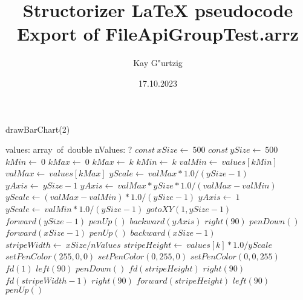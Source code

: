 \documentclass[a4paper,10pt]{article}
\title{Structorizer LaTeX pseudocode Export of FileApiGroupTest.arrz}
\author{Kay G"urtzig}
\date{17.10.2023}
\begin{document}
\begin{algorithm}
\caption{drawBarChart(2)}
\begin{algorithmic}[5]
\State {}
\State {}
\State {}
\State {}
    \State values: array\ of\ double
    \State nValues: ?
  \EndDecl
  \State \(const\ xSize\gets\ 500\)
  \State \(const\ ySize\gets\ 500\)
  \State \(kMin\gets\ 0\)
  \State \(kMax\gets\ 0\)
      \State \(kMax\gets\ k\)
    \Else
        \State \(kMin\gets\ k\)
      \EndIf
    \EndIf
  \EndFor
  \State \(valMin\gets\ values[kMin]\)
  \State \(valMax\gets\ values[kMax]\)
  \State \(yScale\gets\ valMax*1.0/(ySize-1)\)
  \State \(yAxis\gets\ ySize-1\)
      \State \(yAxis\gets\ valMax*ySize*1.0/(valMax-valMin)\)
      \State \(yScale\gets(valMax-valMin)*1.0/(ySize-1)\)
    \Else
      \State \(yAxis\gets\ 1\)
      \State \(yScale\gets\ valMin*1.0/(ySize-1)\)
    \EndIf
  \EndIf
  \State \(gotoXY(1,ySize-1)\)
  \State \(forward(ySize-1)\)
  \State \(penUp()\)
  \State \(backward(yAxis)\)
  \State \(right(90)\)
  \State \(penDown()\)
  \State \(forward(xSize-1)\)
  \State \(penUp()\)
  \State \(backward(xSize-1)\)
  \State \(stripeWidth\gets\ xSize/nValues\)
    \State \(stripeHeight\gets\ values[k]*1.0/yScale\)
        \State \(setPenColor(255,0,0)\)
      \EndSelector
        \State \(setPenColor(0,255,0)\)
      \EndSelector
        \State \(setPenColor(0,0,255)\)
      \EndSelector
    \EndCase
    \State \(fd(1)\)
    \State \(left(90)\)
    \State \(penDown()\)
    \State \(fd(stripeHeight)\)
    \State \(right(90)\)
    \State \(fd(stripeWidth-1)\)
    \State \(right(90)\)
    \State \(forward(stripeHeight)\)
    \State \(left(90)\)
    \State \(penUp()\)
  \EndFor
\EndProcedure
\end{algorithmic}
\end{algorithm}
\end{document}
